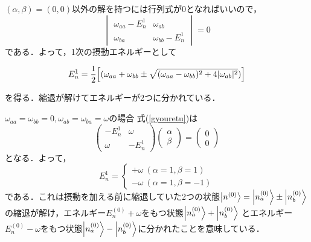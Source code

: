 \documentclass{report}
\begin{document}
  $(\alpha,\beta)=(0,0)$以外の解を持つには行列式が0となればいいので，
  \begin{equation}
    \begin{vmatrix}
      \omega_{aa}-E_n^1&\omega_{ab}\\
      \omega_{ba}&\omega_{bb}-E_n^1
    \end{vmatrix}
    =0
  \end{equation}
  である．よって，1次の摂動エネルギーとして
  \begin{screen}
  \begin{equation}
    \label{syukutai}
    E_n^1=\frac{1}{2}\qty[(\omega_{aa}+\omega_{bb}\pm\sqrt{(\omega_{aa}-\omega_{bb})^2+4|\omega_{ab}|^2})]
  \end{equation}
  \end{screen}
  を得る．縮退が解けてエネルギーが2つに分かれている．
  \begin{myex}{}{}$\omega_{aa}=\omega_{bb}=0,\omega_{ab}=\omega_{ba}=\omega$の場合
  式(\ref{gyouretu})は
  \begin{equation}
    \begin{pmatrix}
      -E_n^1&\omega\\
      \omega&-E_n^1
    \end{pmatrix}
    \begin{pmatrix}
      \alpha\\
      \beta
    \end{pmatrix}
    =\begin{pmatrix}
      0\\0
    \end{pmatrix}
  \end{equation}
  となる．よって，
  \begin{equation}
    E_n^1=
    \begin{cases}
      +\omega\ (\alpha=1,\beta=1)\\
      -\omega\ (\alpha=1,\beta=-1)
    \end{cases}
  \end{equation}
  である．これは摂動を加える前に縮退していた2つの状態$\ket{n^{(0)}}=\ket{n_a^{(0)}}\pm\ket{n_b^{(0)}}$の縮退が解け，エネルギー$E_n^{(0)}+\omega$をもつ状態$\ket{n_a^{(0)}}+\ket{n_b^{(0)}}$
  とエネルギー$E_n^{(0)}-\omega$をもつ状態$\ket{n_a^{(0)}}-\ket{n_b^{(0)}}$に分かれたことを意味している．
  \end{myex}
\end{document}
